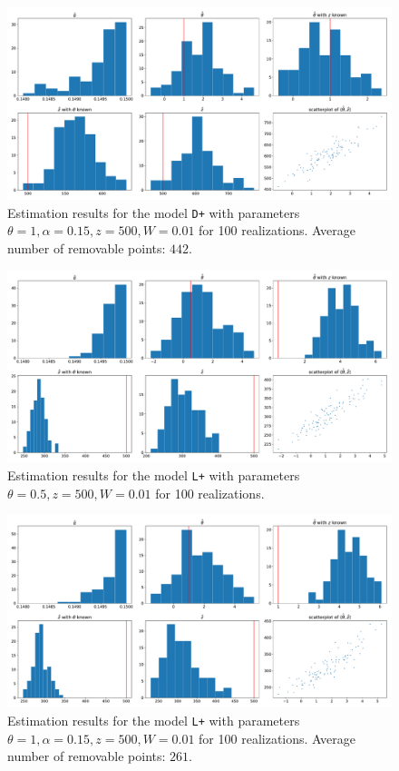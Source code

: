 \begin{figure}
  \centering
  \includegraphics[width=1\textwidth]{"../img/numeric/estimation - type_D+_theta_1"}
  \caption{Estimation results for the model \texttt{D+} with parameters $\theta=1,\alpha=0.15,z=500,W=0.01$ for 100 realizations. Average number of removable points: $442$.}
  \label{fig:estD1}
\end{figure}

\begin{figure}
  \centering
  \includegraphics[width=1\textwidth]{"../img/numeric/estimation - type_L+_theta_05"}
  \caption{Estimation results for the model \texttt{L+} with parameters $\theta=0.5,z=500,W=0.01$ for 100 realizations. }
  \label{fig:estL05}
\end{figure}


\begin{figure}
  \centering
  \includegraphics[width=1\textwidth]{"../img/numeric/estimation - type_L+_theta_1"}
  \caption{Estimation results for the model \texttt{L+} with parameters $\theta=1,\alpha=0.15,z=500,W=0.01$ for 100 realizations. Average number of removable points: $261$.}
  \label{fig:estL1}
\end{figure}




